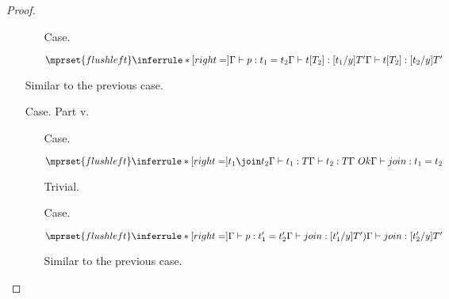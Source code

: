 \begin{proof}
\begin{itemize}
\begin{itemize}
  \item[Case.] \ \\
    \begin{center}
      \begin{math}
        $$\mprset{flushleft}
        \inferrule* [right=] {
          \Gamma \vdash p:t_1 = t_2
          \\
          \Gamma \vdash t[T_2]:[t_1/y]T'
        }{\Gamma \vdash t[T_2]:[t_2/y]T'}
      \end{math}
    \end{center}
  \end{itemize}
  Similar to the previous case.

\item[Case.] Part v.\\
  \begin{itemize}
  \item[Case.] \ \\
    \begin{center}
      \begin{math}
        $$\mprset{flushleft}
        \inferrule* [right=] {
          t_1 \join t_2
	  \\
          \Gamma \vdash t_1:T
          \\
          \Gamma \vdash t_2:T
          \\
	  \Gamma\ Ok
        }{\Gamma \vdash join : t_1 = t_2}
      \end{math}
    \end{center}
    Trivial.
  
  \item[Case.] \ \\
    \begin{center}
      \begin{math}
        $$\mprset{flushleft}
        \inferrule* [right=] {
          \Gamma \vdash p:t'_1 = t'_2
          \\
          \Gamma \vdash join:[t'_1/y]T')
        }{\Gamma \vdash join:[t'_2/y]T'}
      \end{math}
    \end{center}
    Similar to the previous case.
  \end{itemize}
\end{itemize}
\end{proof}

